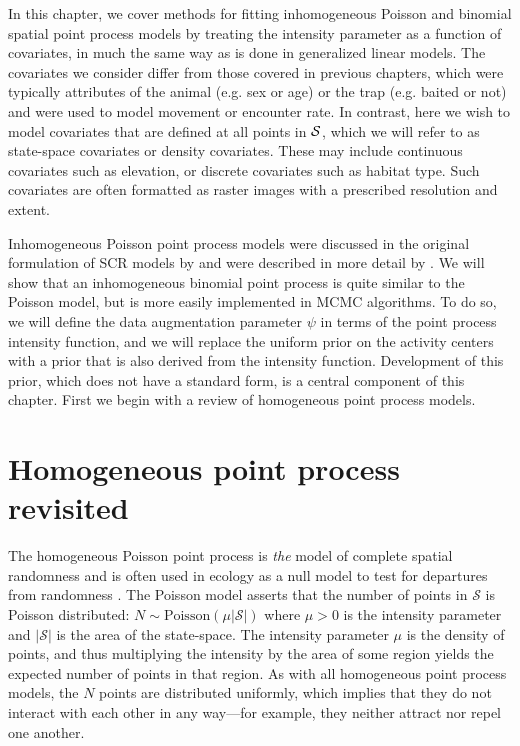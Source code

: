 In this chapter, we cover methods %
for fitting inhomogeneous Poisson and binomial
spatial point process models by treating the intensity parameter as a
function of covariates, in much the same way as is done in generalized linear
models. The covariates we consider differ
from those covered in previous chapters, which were typically
attributes of the animal (e.g. sex or age) or the trap (e.g. baited or
not) and were used to model movement or encounter
rate. In contrast, here we wish to model covariates that are defined
at all points in $\cal S$, which we will refer to as
state-space covariates or density covariates. These may
include continuous covariates such as elevation, or discrete
covariates such as habitat type. Such covariates are often formatted
as raster images with a prescribed resolution and extent.

Inhomogeneous Poisson point process models were discussed in the original
formulation of SCR models by \citet{efford:2004} and were described in
more detail by \citet{borchers_efford:2008}. We will show that an
inhomogeneous binomial point process is quite similar to the Poisson
model, but is more easily implemented in MCMC algorithms. To do so, we
will define the data augmentation parameter $\psi$ in terms of the point
process intensity function, and we will replace the uniform prior on the
activity centers with a prior that is also derived from the intensity
function. Development of this prior, which does not have a
standard form, is a central component of this chapter. First we
begin with a review of homogeneous point process models.


\section{Homogeneous point process revisited}

The homogeneous Poisson point process is \textit{the} model of complete
spatial randomness and is often used in ecology as a null model
to test for departures from randomness
\citep{cressie:1992, diggle:2003, illian_etal:2008}.
The Poisson model asserts that the number of points in $\mathcal{S}$ is
Poisson distributed: $N \sim \text{Poisson}(\mu|\mathcal{S}|)$ where $\mu>0$ is
the intensity parameter and $|\mathcal{S}|$ is the area of the
state-space. The intensity parameter $\mu$
is the density of points, and thus multiplying the intensity by the area
of some region yields the expected number of points in that region.
As with all homogeneous point process models, the $N$ points are
distributed uniformly, which implies that they do not interact with each other in
any way---for example, they neither attract nor repel one another.


